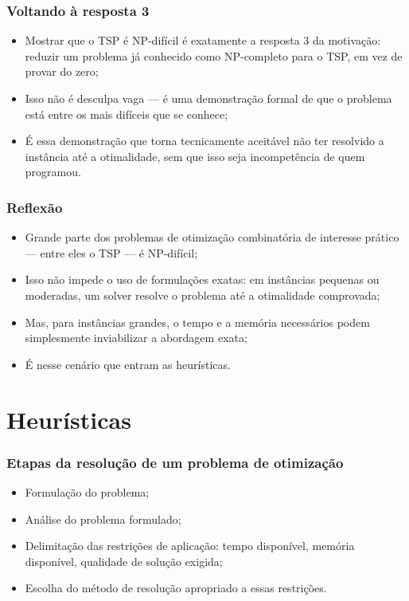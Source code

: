 \documentclass[fleqn]{beamer}
\begin{document}
\begin{frame}
	\frametitle{Voltando à resposta 3}
	\begin{itemize}
		\item Mostrar que o TSP é NP-difícil é exatamente a resposta 3
			da motivação: reduzir um problema já conhecido como
			NP-completo para o TSP, em vez de provar do zero;
		\item Isso não é desculpa vaga — é uma demonstração formal de
			que o problema está entre os mais difíceis que se conhece;
		\item É essa demonstração que torna tecnicamente aceitável não
			ter resolvido a instância até a otimalidade, sem que isso seja
			incompetência de quem programou.
	\end{itemize}
\end{frame}

\begin{frame}
	\frametitle{Reflexão}
	\begin{itemize}
		\item Grande parte dos problemas de otimização combinatória de
			interesse prático — entre eles o TSP — é NP-difícil;
		\item Isso não impede o uso de formulações exatas: em instâncias
			pequenas ou moderadas, um solver resolve o problema até a
			otimalidade comprovada;
		\item Mas, para instâncias grandes, o tempo e a memória necessários
			podem simplesmente inviabilizar a abordagem exata;
		\item É nesse cenário que entram as heurísticas.
	\end{itemize}
\end{frame}

\section{Heurísticas}

\begin{frame}
	\frametitle{Etapas da resolução de um problema de otimização}
	\begin{itemize}
		\item Formulação do problema;
		\item Análise do problema formulado;
		\item Delimitação das restrições de aplicação: tempo disponível,
			memória disponível, qualidade de solução exigida;
		\item Escolha do método de resolução apropriado a essas restrições.
	\end{itemize}
\end{frame}
\end{document}
